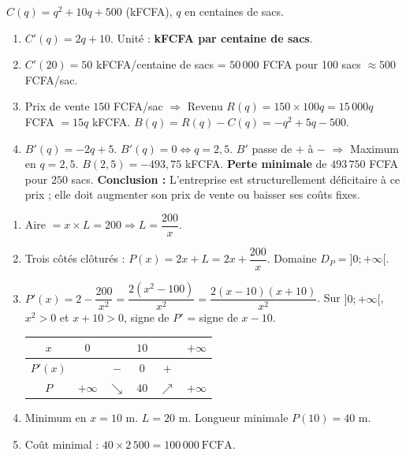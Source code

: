 \documentclass[11pt]{article}
\begin{document}
\begin{exoresolu}
$C(q)=q^2+10q+500$ (kFCFA), $q$ en centaines de sacs.
\begin{enumerate}
    \item $C'(q)=2q+10$. Unité : \textbf{kFCFA par centaine de sacs}.
    \item $C'(20)=50$ kFCFA/centaine de sacs = $50\,000$ FCFA pour 100 sacs $\approx 500$ FCFA/sac.
    \item Prix de vente $150$ FCFA/sac $\Rightarrow$ Revenu $R(q) = 150 \times 100q = 15\,000q$ FCFA $= 15q$ kFCFA.
    $B(q)=R(q)-C(q) = -q^2+5q-500$.
    \item $B'(q)=-2q+5$. $B'(q)=0 \iff q=2,5$. $B'$ passe de $+$ à $-$ $\Rightarrow$ Maximum en $q=2,5$.
    $B(2,5)=-493,75$ kFCFA. \textbf{Perte minimale} de $493\,750$ FCFA pour $250$ sacs.
    \textbf{Conclusion :} L'entreprise est structurellement déficitaire à ce prix ; elle doit augmenter son prix de vente ou baisser ses coûts fixes.
\end{enumerate}
\end{exoresolu}

\begin{exoresolu}
\begin{enumerate}
    \item Aire $= x \times L = 200 \Rightarrow L = \dfrac{200}{x}$.
    \item Trois côtés clôturés : $P(x) = 2x + L = 2x + \dfrac{200}{x}$. Domaine $D_P = ]0;+\infty[$.
    \item $P'(x) = 2 - \dfrac{200}{x^2} = \dfrac{2(x^2-100)}{x^2} = \dfrac{2(x-10)(x+10)}{x^2}$.
    Sur $]0;+\infty[$, $x^2>0$ et $x+10>0$, signe de $P'$ = signe de $x-10$.
    \begin{center}
    \begin{tabular}{|c|ccccc|}\hline
    $x$ & $0$ & & $10$ & & $+\infty$ \\ \hline
    $P'(x)$ & & $-$ & $0$ & $+$ & \\ \hline
    $P$ & $+\infty$ & $\searrow$ & $40$ & $\nearrow$ & $+\infty$ \\ \hline
    \end{tabular}
    \end{center}
    \item Minimum en $x=10$ m. $L = 20$ m. Longueur minimale $P(10)=40$ m.
    \item Coût minimal : $40 \times 2\,500 = \boxed{100\,000\ \text{FCFA}}$.
\end{enumerate}
\end{exoresolu}
\end{document}
